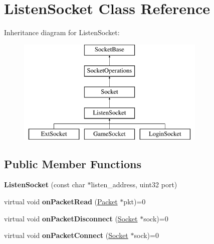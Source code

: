 \hypertarget{classListenSocket}{\section{\-Listen\-Socket \-Class \-Reference}
\label{classListenSocket}
}
\-Inheritance diagram for \-Listen\-Socket\-:\begin{figure}[H]
\begin{center}
\leavevmode
\includegraphics[height=5.000000cm]{classListenSocket}
\end{center}
\end{figure}
\subsection*{\-Public \-Member \-Functions}
\begin{DoxyCompactItemize}
\item 
\hypertarget{classListenSocket_abb668d9c5c3f1e34eed7ecd8f936b74c}{{\bfseries \-Listen\-Socket} (const char $\ast$listen\-\_\-address, uint32 port)}\label{classListenSocket_abb668d9c5c3f1e34eed7ecd8f936b74c}

\item 
\hypertarget{classListenSocket_a6e247371e58d132f8126ed0fca398c74}{virtual void {\bfseries on\-Packet\-Read} (\hyperlink{structPacket}{\-Packet} $\ast$pkt)=0}\label{classListenSocket_a6e247371e58d132f8126ed0fca398c74}

\item 
\hypertarget{classListenSocket_a2e5ebc196501115b5ac907e26a01438f}{virtual void {\bfseries on\-Packet\-Disconnect} (\hyperlink{classSocket}{\-Socket} $\ast$sock)=0}\label{classListenSocket_a2e5ebc196501115b5ac907e26a01438f}

\item 
\hypertarget{classListenSocket_abf9cf3236b524d14998c893bd1b8365d}{virtual void {\bfseries on\-Packet\-Connect} (\hyperlink{classSocket}{\-Socket} $\ast$sock)=0}\label{classListenSocket_abf9cf3236b524d14998c893bd1b8365d}

\end{DoxyCompactItemize}
